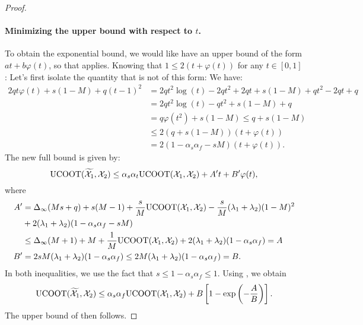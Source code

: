 \begin{proof}
    \paragraph{Minimizing the upper bound with respect to $t$.}
    To obtain the exponential bound, we would like have an upper bound of the form
    $at + b\varphi(t)$, so that  applies.
    Knowing that $1 \leq 2(t + \varphi(t))$ for any $t \in [0, 1]$:
    Let's first isolate the quantity that is not of this form:
    We have:
    \begin{equation}
      \begin{split}
        2q t \varphi(t) + s(1 - M) + q(t-1)^2 &= 2qt^2\log(t) - 2qt^2 + 2qt + s(1-M) + qt^2 -2qt + q \\
        &=  2qt^2\log(t) - qt^2 + s(1-M) + q \\
        &= q\varphi(t^2) + s(1-M) \leq q + s(1-M) \\
        &\leq 2(q + s(1-M)) (t + \varphi(t)) \\
        &= 2(1 -\alpha_s\alpha_f - sM) (t + \varphi(t)).
      \end{split}
    \end{equation}
    The new full bound is given by:
    \begin{equation}
        \text{UCOOT}(\widetilde{\mathcal X_1}, \mathcal X_2) \leq \alpha_s\alpha_t \text{UCOOT}(\mathcal X_1, \mathcal X_2) + A' t + B'\varphi(t),
    \end{equation}
    where
    \begin{equation}
        \begin{split}
            A' &= \Delta_{\infty}(Ms + q) + s(M-1) + \frac{s}{M}\text{UCOOT}(\mathcal X_1, \mathcal X_2) - \frac{s}{M}(\lambda_1 + \lambda_2)(1-M)^2 \\
            &+ 2(\lambda_1 + \lambda_2) (1-\alpha_s\alpha_f - sM) \\
            & \leq \Delta_{\infty}(M + 1) + M + \frac{1}{M}\text{UCOOT}(\mathcal X_1, \mathcal X_2) + 2(\lambda_1 + \lambda_2) (1-\alpha_s\alpha_f) = A \\
            B' &= 2sM(\lambda_1 + \lambda_2) (1-\alpha_s\alpha_f) \leq 2M(\lambda_1 + \lambda_2) (1-\alpha_s\alpha_f) = B.
        \end{split}
    \end{equation}
    In both inequalities, we use the fact that $s \leq 1 - \alpha_s \alpha_f \leq 1$.
    Using , we obtain
    \begin{equation}
        \text{UCOOT}(\widetilde{\mathcal X_1}, \mathcal X_2)
        \leq \alpha_s\alpha_f \text{UCOOT}(\mathcal X_1, \mathcal X_2) + B \left[ 1 - \exp{ \left(- \frac{A}{B} \right) }\right].
    \end{equation}
    The upper bound of  then follows.
  \end{proof}

